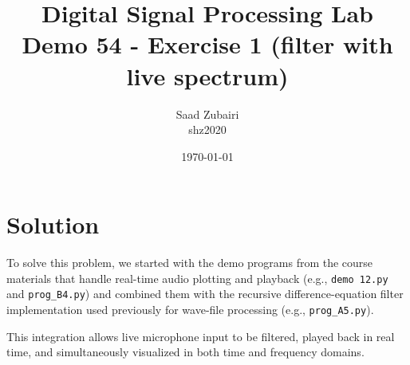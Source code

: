 \documentclass[11pt]{article}
\title{
    \vspace{3em}
    \textbf{Digital Signal Processing Lab}\\
    Demo 54 - Exercise 1 (filter with live spectrum)
    \vspace{1em}
}
\author{
    Saad Zubairi \\ 
    shz2020 \\
    \vspace{1em}
}
\date{\today}
\begin{document}
\maketitle	

\pagebreak



\section*{Solution}

To solve this problem, we started with the demo programs from the course materials that handle real-time audio plotting and playback (e.g., \texttt{demo 12.py} and \texttt{prog\_B4.py}) and combined them with the recursive difference-equation filter implementation used previously for wave-file processing (e.g., \texttt{prog\_A5.py}).

This integration allows live microphone input to be filtered, played back in real time, and simultaneously visualized in both time and frequency domains.
\end{document}
